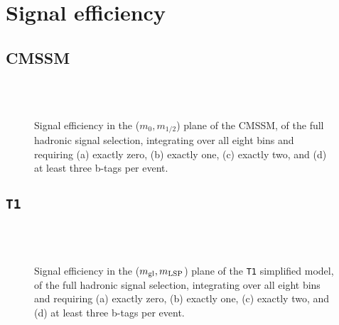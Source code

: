 \newpage
\section{Signal efficiency\label{app:sig-eff}}

\subsection{CMSSM\label{app:sig-eff-cmssm}}

\begin{figure}[h!]
  \begin{center}
     \\
     \\
    \caption{\label{fig:sig-eff-cmssm}Signal efficiency in the
      ($m_{0},m_{1/2}$) plane of the CMSSM, of the full hadronic
      signal selection, integrating over all eight \HT bins and
      requiring (a) exactly zero, (b) exactly one, (c) exactly two,
      and (d) at least three b-tags per event.}
  \end{center}
\end{figure}

\newpage
\subsection{\texttt{T1}\label{app:sig-eff-t1}}

\begin{figure}[h!]
  \begin{center}
     \\
     \\
    \caption{\label{fig:sig-eff-t1}Signal efficiency in the ($m_{\rm
        gl},m_{\rm LSP}$) plane of the \texttt{T1} simplified model,
      of the full hadronic signal selection, integrating over all
      eight \HT bins and requiring (a) exactly zero, (b) exactly
      one, (c) exactly two, and (d) at least three b-tags per event.}
  \end{center}
\end{figure}


